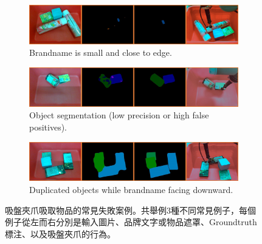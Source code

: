 \begin{figure}
  \centering
  \begin{subfigure}[b]{0.8\textwidth}
    \includegraphics[width=\textwidth]{./figures/5_obj_8_suction_fail_2.jpg}
    \caption{Brandname is small and close to edge.}
    \label{fig:cylinder_suction_fail}
  \end{subfigure}
  \begin{subfigure}[b]{0.8\textwidth}
    \includegraphics[width=\textwidth]{./figures/5_obj_13_suction_fail_3.jpg}
    \caption{Object segmentation (low precision or high false positives).}
    \label{fig:cuboid_suction_fail}
  \end{subfigure}
  \begin{subfigure}[b]{0.8\textwidth}
    \includegraphics[width=\textwidth]{./figures/5_obj_14_suction_fail_1.jpg}
    \caption{Duplicated objects while brandname facing downward.}
    \label{fig:adjacent_suction_fail}
  \end{subfigure}
  \caption{吸盤夾爪吸取物品的常見失敗案例。共舉例3種不同常見例子，每個例子從左而右分別是輸入圖片、品牌文字或物品遮罩、Groundtruth標注、以及吸盤夾爪的行為。
}
  \label{fig:failure}
\end{figure}
